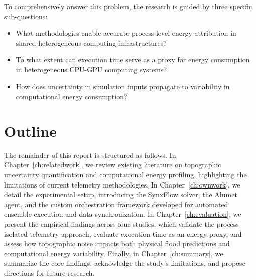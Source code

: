 To comprehensively answer this problem, the research is guided by three specific sub-questions:
\begin{itemize}
    \item What methodologies enable accurate process-level energy attribution in shared heterogeneous computing infrastructures?
    \item To what extent can execution time serve as a proxy for energy consumption in heterogeneous CPU-GPU computing systems?
    \item How does uncertainty in simulation inputs propagate to variability in computational energy consumption?
\end{itemize}


\section{Outline}
\label{sec:outline}

The remainder of this report is structured as follows. In Chapter~\ref{ch:relatedwork}, we review existing literature on topographic uncertainty quantification and computational energy profiling, highlighting the limitations of current telemetry methodologies. In Chapter~\ref{ch:ownwork}, we detail the experimental setup, introducing the SynxFlow solver, the Alumet agent, and the custom orchestration framework developed for automated ensemble execution and data synchronization. In Chapter~\ref{ch:evaluation}, we present the empirical findings across four studies, which validate the process-isolated telemetry approach, evaluate execution time as an energy proxy, and assess how topographic noise impacts both physical flood predictions and computational energy variability. Finally, in Chapter~\ref{ch:summary}, we summarize the core findings, acknowledge the study's limitations, and propose directions for future research.


